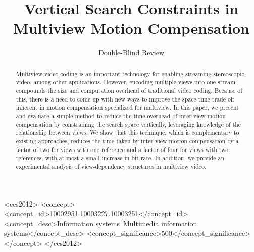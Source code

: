 \documentclass{sig-alternate-05-2015}
\begin{document}

\title{Vertical Search Constraints in Multiview Motion Compensation}
\author{
\alignauthor
Double-Blind Review
}

\maketitle

\begin{abstract}
Multiview video coding is an important technology for enabling streaming
stereoscopic video, among other applications. However, encoding multiple
views into one stream compounds the size and computation overhead of
traditional video coding. Because of this, there is a need to come up with new
ways to improve the space-time trade-off inherent in motion compensation
specialized for multiview. In this paper, we present and evaluate a simple
method to reduce the time-overhead of inter-view motion compensation by
constraining the search space vertically, leveraging knowledge of the
relationship between views. We show that this technique, which is
complementary to existing approaches, reduces the time taken by inter-view
motion compensation by a factor of two for views with one reference and a factor
of four for views with two references, with at most a small increase in
bit-rate. In addition, we provide an experimental analysis of view-dependency
structures in multiview video.
\end{abstract}

\begin{CCSXML}
<ccs2012>
<concept>
<concept_id>10002951.10003227.10003251</concept_id>
<concept_desc>Information systems~Multimedia information systems</concept_desc>
<concept_significance>500</concept_significance>
</concept>
</ccs2012>
\end{CCSXML}
\printccsdesc
\end{document}

